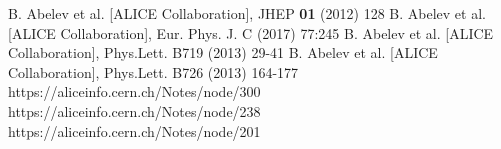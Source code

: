 \begin{thebibliography}{99}
 B. Abelev et al. [ALICE Collaboration], JHEP {\bf 01} (2012) 128
 B. Abelev et al. [ALICE Collaboration], Eur. Phys. J. C (2017) 77:245
 B. Abelev et al. [ALICE Collaboration], Phys.Lett. B719 (2013) 29-41
 B. Abelev et al. [ALICE Collaboration], Phys.Lett. B726 (2013) 164-177
 https://aliceinfo.cern.ch/Notes/node/300
 https://aliceinfo.cern.ch/Notes/node/238
 https://aliceinfo.cern.ch/Notes/node/201
\end{thebibliography} 